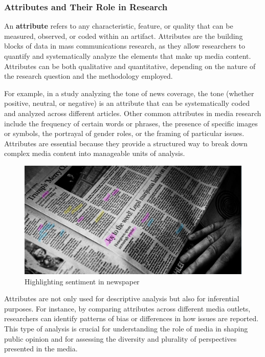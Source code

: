 \documentclass[
]{book}
\begin{document}
\subsubsection*{Attributes and Their Role in Research}\label{attributes-and-their-role-in-research}

An \textbf{attribute} refers to any characteristic, feature, or quality that can be measured, observed, or coded within an artifact. Attributes are the building blocks of data in mass communications research, as they allow researchers to quantify and systematically analyze the elements that make up media content. Attributes can be both qualitative and quantitative, depending on the nature of the research question and the methodology employed.

For example, in a study analyzing the tone of news coverage, the tone (whether positive, neutral, or negative) is an attribute that can be systematically coded and analyzed across different articles. Other common attributes in media research include the frequency of certain words or phrases, the presence of specific images or symbols, the portrayal of gender roles, or the framing of particular issues. Attributes are essential because they provide a structured way to break down complex media content into manageable units of analysis.

\begin{figure}
\centering
\includegraphics[width=1\textwidth,height=\textheight]{images/fig01a.jpg}
\caption{Highlighting sentiment in newspaper}
\end{figure}

Attributes are not only used for descriptive analysis but also for inferential purposes. For instance, by comparing attributes across different media outlets, researchers can identify patterns of bias or differences in how issues are reported. This type of analysis is crucial for understanding the role of media in shaping public opinion and for assessing the diversity and plurality of perspectives presented in the media.
\end{document}
